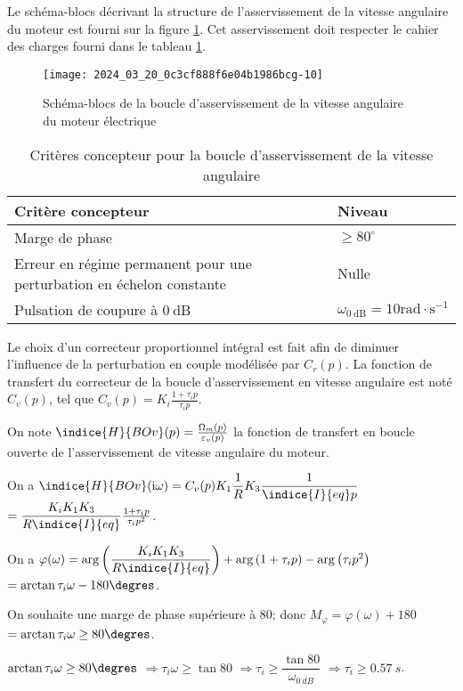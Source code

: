\ifprof
\else
Le schéma-blocs décrivant la structure de l'asservissement de la vitesse angulaire du moteur est fourni sur la figure \ref{Cy_02_Ch_04_TD_02_fig_12}. Cet asservissement doit respecter le cahier des charges fourni dans le tableau \ref{Cy_02_Ch_04_TD_02_tab_04}.

\begin{figure}[!h]
\texttt{[image: 2024\_03\_20\_0c3cf888f6e04b1986bcg-10]}
\caption{Schéma-blocs de la boucle d'asservissement de la vitesse angulaire du moteur électrique \label{Cy_02_Ch_04_TD_02_fig_12}}
\end{figure}

\begin{table}[!h]
\begin{tabular}{p{9cm}l}
\hline
\textbf{Critère concepteur} & \textbf{Niveau} \\
\hline
Marge de phase & $\geqslant 80^{\circ}$ \\
Erreur en régime permanent pour une perturbation en échelon constante & Nulle \\
Pulsation de coupure à $0 \mathrm{~dB}$ & $\omega_{0 \mathrm{~dB}}=10 \mathrm{rad} \cdot \mathrm{s}^{-1}$ \\
\hline
\end{tabular}
\caption{Critères concepteur pour la boucle d'asservissement de la vitesse angulaire \label{Cy_02_Ch_04_TD_02_tab_04}}
\end{table}

Le choix d'un correcteur proportionnel intégral est fait afin de diminuer l'influence de la perturbation en couple modélisée par $C_{r}(p)$. La fonction de transfert du correcteur de la boucle d'asservissement en vitesse angulaire est noté $C_{v}(p)$, tel que $C_{v}(p)=K_{i} \frac{1+\tau_{i} p}{\tau_{i} p}$.


On note $\indice{H}{BOv}(p)=\frac{\Omega_{m}(p)}{\varepsilon_{v}(p)}$ la fonction de transfert en boucle ouverte de l'asservissement de vitesse angulaire du moteur.

\fi

\ifprof
\begin{corrige}
On a $\indice{H}{BOv}(\mathrm{i} \omega) = C_v(p)K_1 \dfrac{1}{R}K_3 \dfrac{1}{\indice{I}{eq}p}$
$= \dfrac{K_{i} K_1 K_3 }{R \indice{I}{eq}}  \frac{1+\tau_{i} p}{\tau_{i} p^2} $.

On a $\varphi(\omega)=\arg\left({\dfrac{K_{i} K_1 K_3 }{R \indice{I}{eq}}}\right) + \arg\left( 1+\tau_{i} p\right) - \arg\left( \tau_{i} p^2\right) $ $=\arctan{\tau_i \omega } - 180\degres$.

On souhaite une marge de phase supérieure à 80\degres; donc $M_{\varphi} = \varphi(\omega) + 180$  $=\arctan{\tau_i \omega} \geq 80\degres$.

$\arctan{\tau_i \omega} \geq 80\degres$ 
$\Rightarrow  \tau_i \omega \geq \tan 80$
$\Rightarrow  \tau_i  \geq \dfrac{\tan 80}{\omega_{\SI{0}{dB}}}$
$\Rightarrow  \tau_i  \geq \SI{0,57}{s}$.
\end{corrige}
\else
\fi

